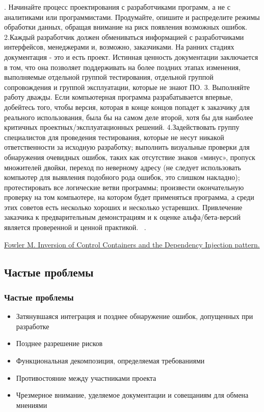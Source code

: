 \documentclass{../industrial-development}
\begin{document}
. Начинайте процесс проектирования с разработчиками программ, а не с аналитиками или программистами. Продумайте, опишите и распределите режимы обработки данных, обращая внимание на риск появления возможных ошибок. 2.Каждый разработчик должен обмениваться информацией с разработчиками интерфейсов, менеджерами и, возможно, заказчиками. На ранних стадиях документация - это и есть проект. Истинная ценность документации заключается в том, что она позволяет поддерживать на более поздних этапах изменения, выполняемые отдельной группой тестирования, отдельной группой сопровождения и группой эксплуатации, которые не знают ПО. 3. Выполняйте работу дважды. Если компьютерная программа разрабатывается впервые, добейтесь того, чтобы версия, которая в конце концов попадет к заказчику для реального использования, была бы на самом деле второй, хотя бы для наиболее критичных проектных/эксплуатационных решений. 4.Задействовать группу специалистов для проведения тестирования, которые не несут никакой ответственности за исходную разработку; выполнить визуальные проверки для обнаружения очевидных ошибок, таких как отсутствие знаков «минус», пропуск множителей двойки, переход по неверному адресу (не следует использовать компьютер для выявления подобного рода ошибок, это слишком накладно); протестировать все логические ветви программы; произвести окончательную проверку на том компьютере, на котором будет применяться программа, а среди этих советов есть несколько хороших и несколько устаревших. Привлечение заказчика к предварительным демонстрациям и к оценке альфа/бета-версий является проверенной и ценной практикой. 
~\cite{Fowler}.

\begin{thebibliography}{99}
 \href{https://project.dovidnyk.info/index.php/programnye-proekty/upravlenieproektamiposozdaniyuprogrammnogoobespecheniya/66-tradicionnoe_upravlenie_razrabotkoj_po}{Fowler M. Inversion of Control Containers and the Dependency Injection pattern.}
\end{thebibliography}

\subsection{Частые проблемы}
\begin{frame} \frametitle{Частые проблемы}
	\begin{itemize}
	  \item Затянувшаяся интеграция и позднее обнаружение ошибок, допущенных при разработке 
		\item Позднее разрешение рисков 
		\item Функциональная декомпозиция, определяемая требованиями 
		\item Противостояние между участниками проекта 
		\item Чрезмерное внимание, уделяемое документации и совещаниям для обмена мнениями 
	\end{itemize}
\end{frame}
\end{document}
